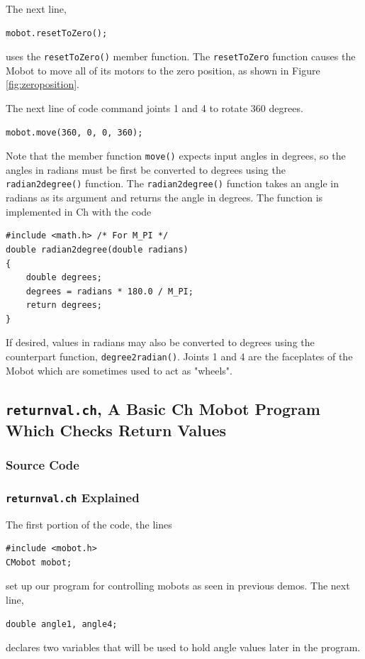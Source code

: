 \documentclass{article}
\begin{document}
The next line,
\begin{verbatim}
mobot.resetToZero();
\end{verbatim}
uses the \texttt{resetToZero()} member function. The
\texttt{resetToZero} function causes the Mobot to move all of its motors to the
zero position, as shown in Figure \ref{fig:zeroposition}.

The next line of code command joints 1 and 4 to rotate 360 degrees.
\begin{verbatim}
mobot.move(360, 0, 0, 360);
\end{verbatim}
Note that the member function \texttt{move()} expects input angles
in degrees, so the angles in radians must be first be converted to degrees 
using the \texttt{radian2degree()} function. The \texttt{radian2degree()} function
takes an angle in radians as its argument and returns the angle in
degrees. The function is implemented in Ch with the code
\begin{verbatim}
#include <math.h> /* For M_PI */
double radian2degree(double radians)
{
    double degrees;
    degrees = radians * 180.0 / M_PI;
    return degrees;
}
\end{verbatim}

If desired, values in radians
may also be converted to degrees using the counterpart function,
\texttt{degree2radian()}.
Joints 1 and 4 are the faceplates
of the Mobot which are sometimes used to act as "wheels".

\subsection{\texttt{returnval.ch}, A Basic Ch Mobot Program Which Checks Return Values}
\subsubsection{Source Code}


\subsubsection{\texttt{returnval.ch} Explained}
The first portion of the code, the lines
\begin{verbatim}
#include <mobot.h>
CMobot mobot;
\end{verbatim}
set up our program for controlling mobots as seen in previous demos. The next line,
\begin{verbatim}
double angle1, angle4;
\end{verbatim}
declares two variables that will be used to hold angle values later in the program.
\end{document}
